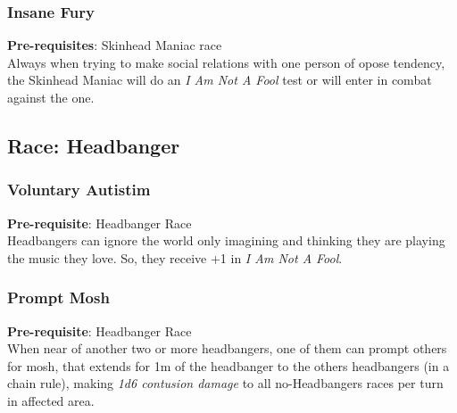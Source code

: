 \documentclass[ letterpaper,12pt]{article}
\begin{document}
\subsubsection{Insane Fury}
 {\bf Pre-requisites}: Skinhead Maniac race\\
 Always when trying to make social relations with one person of opose tendency, the Skinhead Maniac will do an {\it I Am Not A Fool} test or will enter in combat against the one.

\subsection{Race: Headbanger}

\subsubsection{Voluntary Autistim}
{\bf Pre-requisite}: Headbanger Race\\
Headbangers can ignore the world only imagining and thinking they are playing the music they love. So, they receive +1 in {\it I Am Not A Fool}.\\

\subsubsection{Prompt Mosh}
 {\bf Pre-requisite}: Headbanger Race\\
 When near of another two or more headbangers, one of them can prompt others for mosh, that extends for 1m of the headbanger to the others headbangers (in a chain rule), making {\it 1d6 contusion damage} to all no-Headbangers races per turn in affected area.
\end{document}
